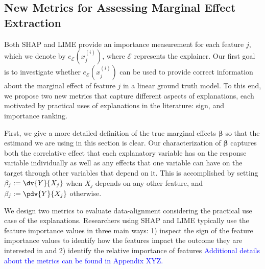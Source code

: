 \documentclass[mnsc,blindrev]{informs3}
\newcommand{\mE}{\mathcal{E}}
\begin{document}
\subsection{New Metrics for Assessing Marginal Effect Extraction}
   \label{sec:evaluating_faithfulness}
  Both SHAP and LIME provide an importance measurement for each feature $j$, which we denote by $e_\mE(x^{(i)}_j)$, where $\mE$ represents the explainer.
   Our first goal is to investigate whether $e_\mE(x^{(i)}_j)$ can be used to provide correct information about the marginal effect of feature $j$ in a linear ground truth model. To this end, we propose two new metrics that capture different aspects of explanations, each motivated by practical uses of explanations in the literature: sign, and importance ranking.%
     
     First, we give a more detailed definition of the true marginal effects $\boldsymbol{\beta}$ so that the estimand we are using in this section is clear. Our characterization of $\boldsymbol{\beta}$ captures both the correlative effect that each explanatory variable has on the response variable individually as well as any effects that one variable can have on the target through other variables that depend on it. This is accomplished by setting $\beta_j := \dv{Y}{X_j}$ when $X_j$ depends on any other feature, and $\beta_j := \pdv{Y}{X_j}$ otherwise. %



         
          We design two metrics to evaluate data-alignment  considering the practical use case of the explanations. Researchers using SHAP and LIME typically use the feature importance values in three main ways: 1) inspect the sign of the feature importance values to identify how the features impact the outcome they are interested in and %
         2)  identify the relative importance of features %
    \textcolor{blue}{Additional details about the metrics can be found in Appendix XYZ.}
\end{document}
